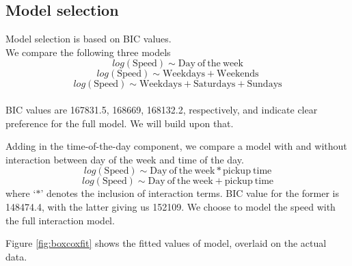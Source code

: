 \documentclass[10pt,a4paper]{article} %
\begin{document}
{    %
    
    
    \subsection{Model selection}
    
    Model selection is based on BIC values.\\We compare the following three models $$log(\mathrm{Speed})\sim\mathrm{Day\ of\ the\ week}$$ $$log(\mathrm{Speed})\sim\mathrm{Weekdays + Weekends}$$ $$log(\mathrm{Speed})\sim\mathrm{Weekdays + Saturdays + Sundays}$$\\
    BIC values are 167831.5, 168669, 168132.2, respectively, and indicate clear preference for the full model. We will build upon that.
    
    Adding in the time-of-the-day component, we compare a model with and without interaction between day of the week and time of the day. $$log(\mathrm{Speed})\sim\mathrm{Day\ of\ the\ week}*\mathrm{pickup\ time}$$ $$log(\mathrm{Speed})\sim\mathrm{Day\ of\ the\ week}+\mathrm{pickup\ time}$$ where `$*$' denotes the inclusion of interaction terms. BIC value for the former is 148474.4, with the latter giving us 152109. We choose to model the speed with the full interaction model.
    
    Figure \ref{fig:boxcoxfit} shows the fitted values of model, overlaid on the actual data.
    
}
\end{document}
